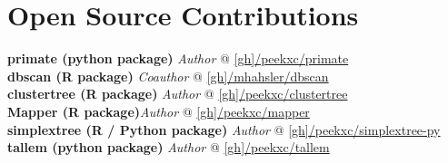 \documentclass[11pt,a4paper,sans]{moderncv} %
\begin{document}
%
%

%
%
%


\section{Open Source Contributions}\label{sec:opensrc}
{\bfseries primate (python package)} \hfill {\em Author} @ \url{[gh]/peekxc/primate} \\
{\bfseries dbscan (R package)} \hfill {\em Coauthor} @ \url{[gh]/mhahsler/dbscan} \\
{\bfseries clustertree (R package)} \hfill {\em Author} @ \url{[gh]/peekxc/clustertree} \\ 
{\bfseries Mapper (R package)}\hfill {\em Author} @ \url{[gh]/peekxc/mapper} \\
{\bfseries simplextree (R / Python package)} \hfill {\em Author} @ \url{[gh]/peekxc/simplextree-py} \\
{\bfseries tallem (python package)} \hfill {\em Author} @ \url{[gh]/peekxc/tallem}


\end{document}
